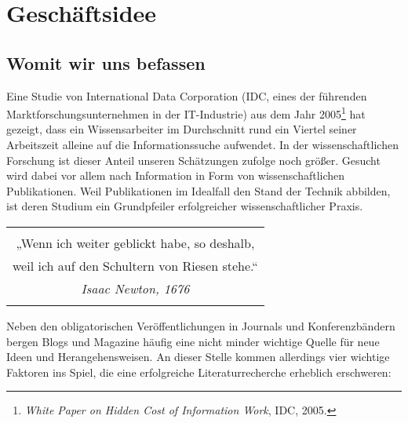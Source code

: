 \section{Geschäftsidee}


\subsection{Womit wir uns befassen}
Eine Studie von International Data Corporation (IDC, eines der führenden Marktforschungsunternehmen in der IT-Industrie) aus dem Jahr 2005\footnote[1]{\textit{White Paper on Hidden Cost of Information Work}, IDC, 2005.} hat gezeigt, dass ein Wissensarbeiter im Durchschnitt rund ein Viertel seiner Arbeitszeit alleine auf die Informationssuche aufwendet. In der wissenschaftlichen Forschung ist dieser Anteil unseren Schätzungen zufolge noch größer. Gesucht wird dabei vor allem nach Information in Form von wissenschaftlichen Publikationen. Weil Publikationen im Idealfall den Stand der Technik abbilden, ist deren Studium ein Grundpfeiler erfolgreicher wissenschaftlicher Praxis. 

\begin{table}[h!]
  \centering
  \begin{large}
	\begin{itshape}
  \begin{tabular}{c}\hline
	\\
  {\color{orange}„Wenn ich weiter geblickt habe, so deshalb,} \\ 
	{\color{orange}weil ich auf den Schultern von Riesen stehe.“} \\
	{\hfill \color{orange}\textit{Isaac Newton, 1676} } \\
	\\\hline
  \end{tabular}
	\end{itshape}
  \end{large}
\end{table}

Neben den obligatorischen Veröffentlichungen in Journals und Konferenzbändern bergen Blogs und Magazine häufig eine nicht minder wichtige Quelle für neue Ideen und Herangehensweisen. An dieser Stelle kommen allerdings vier wichtige Faktoren ins Spiel, die eine erfolgreiche Literaturrecherche erheblich erschweren: 

